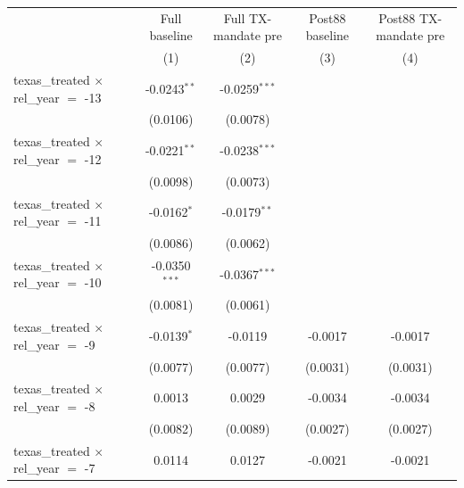 
\begingroup
\centering
\begin{tabular}{lcccc}
   \toprule
                                                & Full baseline   & Full TX-mandate pre & Post88 baseline        & Post88 TX-mandate pre \\   
                                                & (1)             & (2)                 & (3)                    & (4)\\  
   \midrule 
   texas\_treated $\times$ rel\_year $=$ -13    & -0.0243$^{**}$  & -0.0259$^{***}$     &                        &   \\   
                                                & (0.0106)        & (0.0078)            &                        &   \\   
   texas\_treated $\times$ rel\_year $=$ -12    & -0.0221$^{**}$  & -0.0238$^{***}$     &                        &   \\   
                                                & (0.0098)        & (0.0073)            &                        &   \\   
   texas\_treated $\times$ rel\_year $=$ -11    & -0.0162$^{*}$   & -0.0179$^{**}$      &                        &   \\   
                                                & (0.0086)        & (0.0062)            &                        &   \\   
   texas\_treated $\times$ rel\_year $=$ -10    & -0.0350$^{***}$ & -0.0367$^{***}$     &                        &   \\   
                                                & (0.0081)        & (0.0061)            &                        &   \\   
   texas\_treated $\times$ rel\_year $=$ -9     & -0.0139$^{*}$   & -0.0119             & -0.0017                & -0.0017\\   
                                                & (0.0077)        & (0.0077)            & (0.0031)               & (0.0031)\\   
   texas\_treated $\times$ rel\_year $=$ -8     & 0.0013          & 0.0029              & -0.0034                & -0.0034\\   
                                                & (0.0082)        & (0.0089)            & (0.0027)               & (0.0027)\\   
   texas\_treated $\times$ rel\_year $=$ -7     & 0.0114          & 0.0127              & -0.0021                & -0.0021\\   

\end{tabular}
